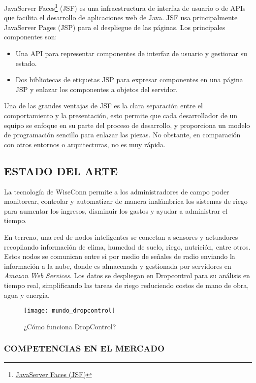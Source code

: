 
JavaServer Faces\footnote{\href{https://www.juntadeandalucia.es/servicios/madeja/contenido/recurso/101}{JavaServer Faces (JSF)}} (JSF) es una infraestructura de interfaz de usuario o de APIs que facilita el desarrollo de aplicaciones web de Java. JSF usa principalmente JavaServer Pages (JSP) para el despliegue de las páginas. Los principales componentes son:
\begin{itemize}
    \item Una API para representar componentes de interfaz de usuario y gestionar su estado.
    \item Dos bibliotecas de etiquetas JSP para expresar componentes en una página JSP y enlazar los componentes a objetos del servidor.
\end{itemize}
Una de las grandes ventajas de JSF es la clara separación entre el comportamiento y la presentación, esto permite que cada desarrollador de un equipo se enfoque en su parte del proceso de desarrollo, y proporciona un modelo de programación sencillo para enlazar las piezas. No obstante, en comparación con otros entornos o arquitecturas, no es muy rápida.

\subsection{ESTADO DEL ARTE}
La tecnología de WiseConn permite a los administradores de campo poder monitorear, controlar y automatizar de manera inalámbrica los sistemas de riego para aumentar los ingresos, disminuir los gastos y ayudar a administrar el tiempo.

En terreno, una red de nodos inteligentes se conectan a sensores y actuadores recopilando información de clima, humedad de suelo, riego, nutrición, entre otros. Estos nodos se comunican entre si por medio de señales de radio enviando la información a la nube, donde es almacenada y gestionada por servidores en \textit{Amazon Web Services}. Los datos se despliegan en Dropcontrol para su análisis en tiempo real, simplificando las tareas de riego reduciendo costos de mano de obra, agua y energía.
\begin{figure}[H]
	\centering
	\texttt{[image: mundo\_dropcontrol]}
	\caption{\label{fig:mundrop} ¿Cómo funciona DropControl?}
\end{figure}

\subsubsection{COMPETENCIAS EN EL MERCADO}

